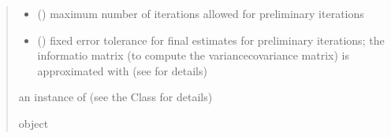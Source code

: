 \documentclass[letterpaper,10pt,english]{sphinxmanual}
\begin{document}
\begin{fulllineitems}
\begin{quote}
\begin{description}
\begin{itemize}
\item {} 
\sphinxAtStartPar
{} () \textendash{} maximum number of iterations allowed for preliminary iterations

\item {} 
\sphinxAtStartPar
{} () \textendash{} fixed error tolerance for final estimates for preliminary iterations;
the informatio matrix (to compute the variance\sphinxhyphen{}covariance matrix) is approximated with 
(see  for details)

\end{itemize}

\sphinxAtStartPar
an instance of  (see the Class for details)

\sphinxAtStartPar
object

\end{description}\end{quote}

\end{fulllineitems}

\end{document}
